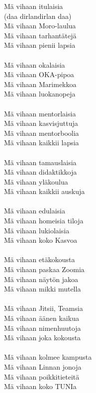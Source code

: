 
Mä vihaan itulaisia \\
(daa dirlandirlan daa) \\
Mä vihaan Moro-laulua \\
Mä vihaan tarhantätejä \\
Mä vihaan pienii lapsia \\

\hspace{10mm} \\

Mä vihaan okalaisia \\
Mä vihaan OKA-pipoa \\
Mä vihaan Marimekkoa \\
Mä vihaan luokanopeja \\

\hspace{10mm} \\

Mä vihaan mentorlaisia \\
Mä vihaan kasvisjuttuja \\
Mä vihaan mentorboolia \\
Mä vihaan kaikkii lapsia \\

\hspace{10mm} \\

Mä vihaan tamauslaisia \\
Mä vihaan didaktikkoja \\
Mä vihaan yläkoulua \\
Mä vihaan kaikkii auskuja \\

\hspace{10mm} \\

Mä vihaan edulaisia \\
Mä vihaan homeisia tiloja \\
Mä vihaan lukiolaisia \\
Mä vihaan koko Kasvoa \\

\hspace{10mm} \\

Mä vihaan etäkokousta \\
Mä vihaan paskaa Zoomia \\
Mä vihaan näytön jakoa \\
Mä vihaan mikki mutella \\

\hspace{10mm} \\

Mä vihaan Jitsii, Teamsia \\
Mä vihaan äänen kaikua \\
Mä vihaan nimenhuutoja \\
Mä vihaan joka kokousta \\

\hspace{10mm} \\

Mä vihaan kolmee kampusta \\
Mä vihaan Linnan jonoja \\
Mä vihaan poikkitieteitä \\
Mä vihaan koko TUNIa \\